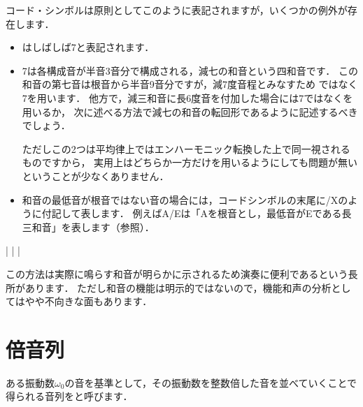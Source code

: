 \documentclass[dvipdfmx,uplatex,b5paper,openany,jbase=12Q,nomag*,textwidth-limit=44%
               ]{gachimuchi}[2020/05/05]
\begin{document}
コード・シンボルは原則としてこのように表記されますが，いくつかの例外が存在します．
\begin{itemize}
  \item \txCirc\Min{}はしばしば\txCirc\hDim\subsc7と表記されます．
  \item \txCirc\Dim\subsc7は各構成音が半音3音分で構成される，減七の和音という四和音です．
        この和音の第七音は根音から半音9音分ですが，減7度音程とみなすため
        \Min{}ではなく\Dim\subsc7を用います．
        他方で，減三和音に長6度音を付加した場合には\Dim\subsc7ではなく\Min{}を用いるか，
        次に述べる方法で減七の和音の転回形であるように記述するべきでしょう．
        
        ただしこの2つは平均律上ではエンハーモニック転換した上で同一視されるものですから，
        実用上はどちらか一方だけを用いるようにしても問題が無いということが少なくありません．
  \item 和音の最低音が根音ではない音の場合には，コードシンボルの末尾に/Xのように付記して表します．
        例えばA/Eは「Aを根音とし，最低音がEである長三和音」を表します（参照）．
\end{itemize}
\begin{Music}[0.6\linewidth]
  \Startpiece%
  \Notes%
  \zchordsu{}|%
  \en%
  \Notes%
  |%
  \en%
  \Notes%
  |%
  \en\setdoublebar%
  \endpiece%
\end{Music}

この方法は実際に鳴らす和音が明らかに示されるため演奏に便利であるという長所があります．
ただし和音の機能は明示的ではないので，機能和声の分析としてはやや不向きな面もあります．


\section{倍音列}
ある振動数$\omega_0$の音を基準として，その振動数を整数倍した音を並べていくことで得られる音列をと呼びます．
\end{document}
